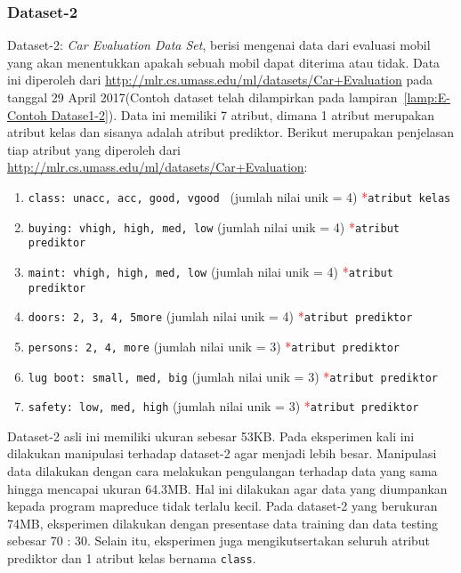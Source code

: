 \subsubsection{Dataset-2}

Dataset-2: \textit{Car Evaluation Data Set}, berisi mengenai data dari evaluasi mobil yang akan menentukkan apakah sebuah mobil dapat diterima atau tidak. Data ini diperoleh dari \url{http://mlr.cs.umass.edu/ml/datasets/Car+Evaluation} pada tanggal 29 April 2017(Contoh dataset telah dilampirkan pada lampiran~\ref{lamp:E-Contoh Datase1-2}). Data ini memiliki 7 atribut, dimana 1 atribut merupakan atribut kelas dan sisanya adalah atribut prediktor. Berikut merupakan penjelasan tiap atribut yang diperoleh dari \url{http://mlr.cs.umass.edu/ml/datasets/Car+Evaluation}:
\begin{enumerate}
	\item \texttt{class: unacc, acc, good, vgood } (jumlah nilai unik = 4) \textcolor{red}{*}\texttt{atribut kelas}
	\item \texttt{buying: vhigh, high, med, low} (jumlah nilai unik = 4) \textcolor{red}{*}\texttt{atribut prediktor}
	\item \texttt{maint: vhigh, high, med, low} (jumlah nilai unik = 4) \textcolor{red}{*}\texttt{atribut prediktor}
	\item \texttt{doors: 2, 3, 4, 5more} (jumlah nilai unik = 4) \textcolor{red}{*}\texttt{atribut prediktor}
	\item \texttt{persons: 2, 4, more} (jumlah nilai unik = 3) \textcolor{red}{*}\texttt{atribut prediktor}
	\item \texttt{lug boot: small, med, big} (jumlah nilai unik = 3) \textcolor{red}{*}\texttt{atribut prediktor}
	\item \texttt{safety: low, med, high} (jumlah nilai unik = 3) \textcolor{red}{*}\texttt{atribut prediktor}
\end{enumerate}

Dataset-2 asli ini memiliki ukuran sebesar 53KB. Pada eksperimen kali ini dilakukan manipulasi terhadap dataset-2 agar menjadi lebih besar. Manipulasi data dilakukan dengan cara melakukan pengulangan terhadap data yang sama hingga mencapai ukuran 64.3MB. Hal ini dilakukan agar data yang diumpankan kepada program mapreduce tidak terlalu kecil. Pada dataset-2 yang berukuran 74MB, eksperimen dilakukan dengan presentase data training dan data testing sebesar 70 : 30. Selain itu, eksperimen juga mengikutsertakan seluruh atribut prediktor dan 1 atribut kelas bernama \texttt{class}.

